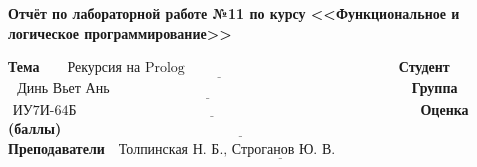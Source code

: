 \begin{titlepage}
	
	\begin{center}
		\Large\textbf{Отчёт по лабораторной работе №11 по курсу <<Функциональное и логическое программирование>>}
	\end{center}
	
	\bigskip\bigskip
	
	\noindent\textbf{Тема} $\underline{\text{~~~~~Рекурсия на Prolog~~~~~~~~~~~~~~~~~~~~~~~~~~~~~~~~~~~~~~~~~~~~~}}$\newline\newline\newline
	\noindent\textbf{Студент} $\underline{\text{~~Динь Вьет Ань~~~~~~~~~~~~~~~~~~~~~~~~~~~~~~~~~~~~~~~~~~~~~~~~~~~~~~~~~~~~~~~~}}$\newline\newline
	\noindent\textbf{Группа} $\underline{\text{~ИУ7И-64Б~~~~~~~~~~~~~~~~~~~~~~~~~~~~~~~~~~~~~~~~~~~~~~~~~~~~~~~~~~~~~~~~~~~~~~~~~}}$\newline\newline
	\noindent\textbf{Оценка (баллы)} $\underline{\text{~~~~~~~~~~~~~~~~~~~~~~~~~~~~~~~~~~~~~~~~~~~~~~~~~~~~~~~~~~~~~~~~~~~~~~~~~~~}}$\newline\newline
	\noindent\textbf{Преподаватели} $\underline{\text{~~Толпинская~Н.~Б., Строганов~Ю.~В.~~~~~~~~~~~~~~~~~~~~~~~~~}}$\newline

 \restoregeometry
\end{titlepage}
